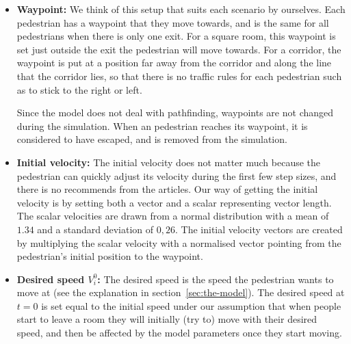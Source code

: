 \begin{itemize}
    \item \textbf{Waypoint:} We think of this setup that suits each scenario  
        by ourselves. Each pedestrian has a waypoint that they move towards, 
        and is the same for all pedestrians when there is only one exit. 
        For a square room, this waypoint is set just outside the exit the pedestrian 
        will move towards. For a corridor, the waypoint is put at a position 
        far away from the corridor and along the line that the corridor lies, so that
        there is no traffic rules for each pedestrian such as to stick to the right or left.
        
        Since the model does not deal with pathfinding, waypoints are not 
        changed during the simulation. When an pedestrian reaches its waypoint, it is 
        considered to have escaped, and is removed from the simulation.

    \item \textbf{Initial velocity:} The initial velocity does not matter much 
        because the pedestrian can quickly adjust its velocity during the first few 
        step sizes, and there is no recommends from the articles. 
        Our way of getting the initial velocity is by setting both a vector and a scalar 
        representing vector length. The scalar velocities are drawn from a 
        normal distribution with a mean of $1.34$ and a standard deviation of 
        $0,26$. The initial velocity vectors are created by multiplying the 
        scalar velocity with a normalised vector pointing from the pedestrian's 
        initial position to the waypoint.

    \item \textbf{Desired speed $  V_{i}^{0}  $:} The desired speed is 
        the speed the pedestrian wants to move at (see the explanation in 
        section~\ref{sec:the-model}). The desired speed at $ t=0 $ is set 
        equal to the initial speed 
        under our assumption that when people start to leave a room they will 
        initially (try to) move with their desired speed, and then be 
        affected by the model parameters once they start moving.


\end{itemize}
